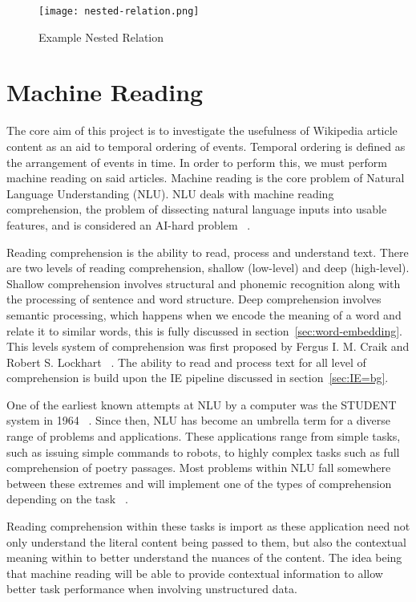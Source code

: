 \documentclass[bsc,frontabs,twoside,singlespacing,parskip,deptreport]{infthesis}     %
\begin{document}
\begin{figure}[H]
  \centering
  \texttt{[image: nested-relation.png]}
  \caption{Example Nested Relation}
  \label{fig:nested-relation}
\end{figure}


\section{Machine Reading}
The core aim of this project is to investigate the usefulness of Wikipedia article content as an aid to temporal ordering of events.
Temporal ordering is defined as the arrangement of events in time.
In order to perform this, we must perform machine reading on said articles.
Machine reading is the core problem of Natural Language Understanding (NLU).
NLU deals with machine reading comprehension, the problem of dissecting natural language inputs into usable features,
and is considered an AI-hard problem ~\cite{}.

Reading comprehension is the ability to read, process and understand text.  
There are two levels of reading comprehension, shallow (low-level) and deep (high-level).
Shallow comprehension involves structural and phonemic recognition along with the processing of sentence and  word
structure.
Deep comprehension involves semantic processing, which happens when we encode the meaning of a word and relate it
to similar words, this is fully discussed in section~\ref{sec:word-embedding}.
This levels system of comprehension was first proposed by  Fergus I. M. Craik and Robert S. Lockhart ~\cite{wagner2009beyond}.
The ability to read and process text for all level of comprehension is build upon the IE pipeline discussed in section~\ref{sec:IE=bg}.

One of the earliest known attempts at NLU by a computer was the STUDENT system in 1964 ~\cite{russell1995modern}.
Since then, NLU has become an
umbrella term for a diverse range of problems and applications. These applications range from simple tasks, such as
issuing simple commands to robots, to highly complex tasks such as full comprehension of poetry passages.
Most problems within NLU fall somewhere between these extremes and will implement one of the types of comprehension
depending on the task ~\cite{}.

Reading comprehension within these tasks is import as these application need not only understand the literal content
being passed to them, but also the contextual meaning within to better understand the nuances of the content.
The idea being that machine reading will be able to provide contextual information to allow better task performance when
involving unstructured data.
\end{document}
